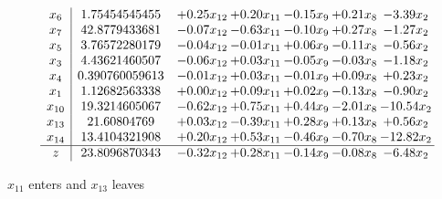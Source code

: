 \documentclass[9pt]{article}
\begin{document}
 \[\begin{array}{c| c c@{\hskip 2pt} c@{\hskip 2pt} c@{\hskip 2pt} c@{\hskip 2pt} c@{\hskip 2pt} }
 x_{6}   &  1.75454545455 & +  0.25 x_{12} & +  0.20 x_{11} & -0.15 x_{9} & +  0.21 x_{8} & -3.39 x_{2}\\
 x_{7}   &  42.8779433681 & -0.07 x_{12} & -0.63 x_{11} & -0.10 x_{9} & +  0.27 x_{8} & -1.27 x_{2}\\
 x_{5}   &  3.76572280179 & -0.04 x_{12} & -0.01 x_{11} & +  0.06 x_{9} & -0.11 x_{8} & -0.56 x_{2}\\
 x_{3}   &  4.43621460507 & -0.06 x_{12} & +  0.03 x_{11} & -0.05 x_{9} & -0.03 x_{8} & -1.18 x_{2}\\
 x_{4}   &  0.390760059613 & -0.01 x_{12} & +  0.03 x_{11} & -0.01 x_{9} & +  0.09 x_{8} & +  0.23 x_{2}\\
 x_{1}   &  1.12682563338 & +  0.00 x_{12} & +  0.09 x_{11} & +  0.02 x_{9} & -0.13 x_{8} & -0.90 x_{2}\\
 x_{10}   &  19.3214605067 & -0.62 x_{12} & +  0.75 x_{11} & +  0.44 x_{9} & -2.01 x_{8} & -10.54 x_{2}\\
 x_{13}   &  21.60804769 & +  0.03 x_{12} & -0.39 x_{11} & +  0.28 x_{9} & +  0.13 x_{8} & +  0.56 x_{2}\\
 x_{14}   &  13.4104321908 & +  0.20 x_{12} & +  0.53 x_{11} & -0.46 x_{9} & -0.70 x_{8} & -12.82 x_{2}\\
\hline
z    &  23.8096870343 & -0.32 x_{12} & +  0.28 x_{11} & -0.14 x_{9} & -0.08 x_{8} & -6.48 x_{2}\\
\end{array}\]


 $ x_{11} $ enters and $ x_{13} $ leaves 
\end{document}
